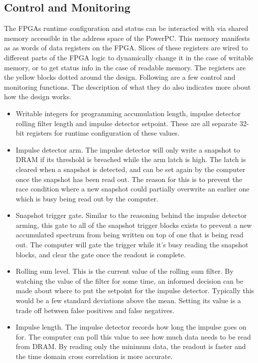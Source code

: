 \subsection{Control and Monitoring}
The FPGAs runtime configuration and status can be interacted with via shared memory accessible in the address space of the PowerPC. This memory manifests as as words of data registers on the FPGA. Slices of these registers are wired to different parts of the FPGA logic to dynamically change it in the case of writable memory, or to get status info in the case of readable memory. The registers are the yellow blocks dotted around the design. Following are a few control and monitoring functions. The description of what they do also indicates more about how the design works.
\begin{itemize}
  \item Writable integers for programming accumulation length, impulse detector rolling filter length and impulse detector setpoint. These are all separate 32-bit registers for runtime configuration of these values.
  \item Impulse detector arm. The impulse detector will only write a snapshot to DRAM if its threshold is breached while the arm latch is high. The latch is cleared when a snapshot is detected, and can be set again by the computer once the snapshot has been read out. The reason for this is to prevent the race condition where a new snapshot could partially overwrite an earlier one which is busy being read out by the computer.
  \item Snapshot trigger gate. Similar to the reasoning behind the impulse detector arming, this gate to all of the snapshot trigger blocks exists to prevent a new accumulated spectrum from being written on top of one that is being read out. The computer will gate the trigger while it's busy reading the snapshot blocks, and clear the gate once the readout is complete.
  \item Rolling sum level. This is the current value of the rolling sum filter. By watching the value of the filter for some time, an informed decision can be made about where to put the setpoint for the impulse detector. Typically this would be a few standard deviations above the mean. Setting its value is a trade off between false positives and false negatives.
  \item Impulse length. The impulse detector records how long the impulse goes on for. The computer can poll this value to see how much data needs to be read from DRAM. By reading only the minimum data, the readout is faster and the time domain cross correlation is more accurate.

\end{itemize}
